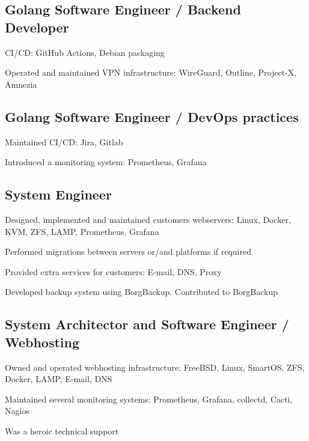 \documentclass[letter,10pt]{article}
\begin{document}
\subsection{Golang Software Engineer / Backend Developer}
\begin{zitemize}
\item CI/CD: GitHub Actions, Debian packaging
\item Operated and maintained VPN infrastructure: WireGuard, Outline, Project-X, Amnezia
\end{zitemize}

\subsection{{Golang Software Engineer / DevOps practices}}
\begin{zitemize}
\item Maintained CI/CD: Jira, Gitlab
\item Introduced a monitoring system: Prometheus, Grafana
\end{zitemize}

\subsection{{System Engineer}}
\begin{zitemize}
\item Designed, implemented and maintained customers webservers: Linux, Docker, KVM, ZFS, LAMP, Prometheus, Grafana
\item Performed migrations between servers or/and platforms if required
\item Provided extra services for customers: E-mail, DNS, Proxy
\item Developed backup system using BorgBackup. Contributed to BorgBackup
\end{zitemize}


\subsection{{System Architector and Software Engineer / Webhosting}}
\begin{zitemize}
\item Owned and operated webhosting infrastructure: FreeBSD, Linux, SmartOS, ZFS, Docker, LAMP, E-mail, DNS
\item Maintained several monitoring systems: Prometheus, Grafana, collectd, Cacti, Nagios
\item Was a heroic technical support
\end{zitemize}
\end{document}
